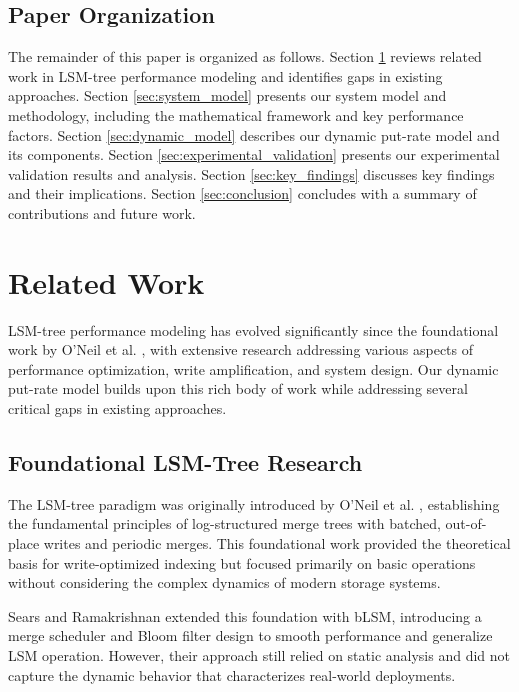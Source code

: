 \documentclass[11pt]{article}
\begin{document}
\subsection{Paper Organization}

The remainder of this paper is organized as follows. Section \ref{sec:related_work} reviews related work in LSM-tree performance modeling and identifies gaps in existing approaches. Section \ref{sec:system_model} presents our system model and methodology, including the mathematical framework and key performance factors. Section \ref{sec:dynamic_model} describes our dynamic put-rate model and its components. Section \ref{sec:experimental_validation} presents our experimental validation results and analysis. Section \ref{sec:key_findings} discusses key findings and their implications. Section \ref{sec:conclusion} concludes with a summary of contributions and future work.

\section{Related Work}
\label{sec:related_work}

LSM-tree performance modeling has evolved significantly since the foundational work by O'Neil et al. \cite{oneil1996lsmtree}, with extensive research addressing various aspects of performance optimization, write amplification, and system design. Our dynamic put-rate model builds upon this rich body of work while addressing several critical gaps in existing approaches.

\subsection{Foundational LSM-Tree Research}

The LSM-tree paradigm was originally introduced by O'Neil et al. \cite{oneil1996lsmtree}, establishing the fundamental principles of log-structured merge trees with batched, out-of-place writes and periodic merges. This foundational work provided the theoretical basis for write-optimized indexing but focused primarily on basic operations without considering the complex dynamics of modern storage systems.

Sears and Ramakrishnan \cite{sears2012blsm} extended this foundation with bLSM, introducing a merge scheduler and Bloom filter design to smooth performance and generalize LSM operation. However, their approach still relied on static analysis and did not capture the dynamic behavior that characterizes real-world deployments.
\end{document}
